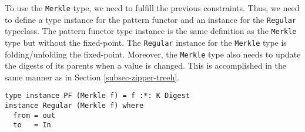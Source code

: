 To use the \texttt{Merkle} type, we need to fulfill the previous constraints. Thus, we need to define a type instance for the pattern functor and an instance for the \texttt{Regular} typeclass. The pattern functor type instance is the same definition as the \texttt{Merkle} type but without the fixed-point. The \texttt{Regular} instance for the \texttt{Merkle} type is folding/unfolding the fixed-point. Moreover, the \texttt{Merkle} type also needs to update the digests of its parents when a value is changed. This is accomplished in the same manner as in Section \ref*{subsec-zipper-treeh}.

\begin{verbatim}
type instance PF (Merkle f) = f :*: K Digest
instance Regular (Merkle f) where
  from = out
  to   = In
\end{verbatim}